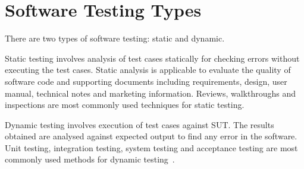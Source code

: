 




\section{Software Testing Types}
There are two types of software testing: static and dynamic.

Static testing involves analysis of test cases statically for checking errors without executing the test cases. Static analysis is applicable to evaluate the quality of software code and supporting documents including requirements, design, user manual, technical notes and marketing information. Reviews, walkthroughs and inspections are most commonly used techniques for static testing.

Dynamic testing involves execution of test cases against SUT. The results obtained are analysed against expected output to find any error in the software. Unit testing, integration testing, system testing and acceptance testing are most commonly used methods for dynamic testing~\cite{fairley1978tutorial}.

